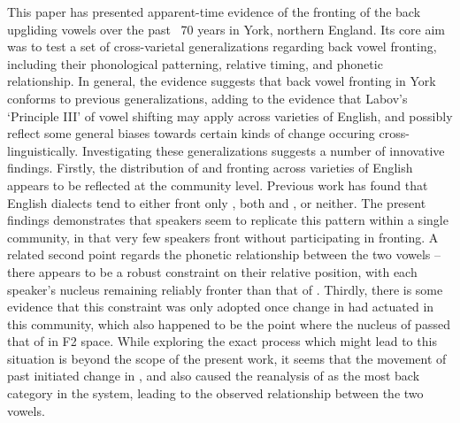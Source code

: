 \documentclass[12pt]{article}
\begin{document}
This paper has presented apparent-time evidence of the fronting of the back upgliding vowels over the past ~70 years in York, northern England. Its core aim was to test a set of cross-varietal generalizations regarding back vowel fronting, including their phonological patterning, relative timing, and phonetic relationship. In general, the evidence suggests that back vowel fronting in York conforms to previous generalizations, adding to the evidence that Labov's `Principle III' of vowel shifting may apply across varieties of English, and possibly reflect some general biases towards certain kinds of change occuring cross-linguistically. Investigating these generalizations suggests a number of innovative findings. Firstly, the distribution of  and  fronting across varieties of English appears to be reflected at the community level. Previous work has found that English dialects tend to either front only , both  and , or neither. The present findings demonstrates that speakers seem to replicate this pattern within a single community, in that very few speakers front  without participating in  fronting. A related second point regards the phonetic relationship between the two vowels -- there appears to be a robust constraint on their relative position, with each speaker's  nucleus remaining reliably fronter than that of . Thirdly, there is some evidence that this constraint was only adopted once change in  had actuated in this community, which also happened to be the point where the nucleus of  passed that of  in F2 space. While exploring the exact process which might lead to this situation is beyond the scope of the present work, it seems that the movement of  past  initiated change in , and also caused the reanalysis of  as the most back category in the system, leading to the observed relationship between the two vowels.
\end{document}
